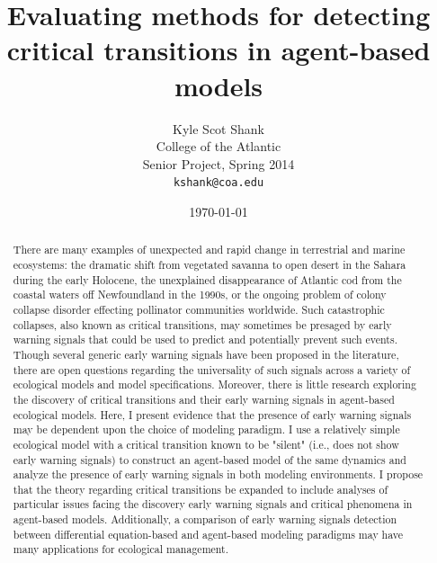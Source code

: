\documentclass[12pt]{article}
\begin{document}
\title{Evaluating methods for detecting critical transitions in agent-based models}
\author{Kyle Scot Shank\\
  College of the Atlantic\\
  Senior Project, Spring 2014\\
  \texttt{kshank@coa.edu}}
\date{\today}
\maketitle
\thispagestyle{empty}
\newpage

\begin{abstract}\noindent
There are many examples of unexpected and rapid change in terrestrial and marine ecosystems: the dramatic shift from vegetated savanna to open desert in the Sahara during the early Holocene, the unexplained disappearance of Atlantic cod from the coastal waters off Newfoundland in the 1990s, or the ongoing problem of colony collapse disorder effecting pollinator communities worldwide. Such catastrophic collapses, also known as critical transitions, may sometimes be presaged by early warning signals that could be used to predict and potentially prevent such events. Though several generic early warning signals have been proposed in the literature, there are open questions regarding the universality of such signals across a variety of ecological models and model specifications. Moreover, there is little research exploring the discovery of critical transitions and their early warning signals in agent-based ecological models. Here, I present evidence that the presence of early warning signals may be dependent upon the choice of modeling paradigm. I use a relatively simple ecological model with a critical transition known to be "silent" (i.e.,  does not show early warning signals) to construct an agent-based model of the same dynamics and analyze the presence of early warning signals in both modeling environments. I propose that the theory regarding critical transitions be expanded to include analyses of particular issues facing the discovery early warning signals and critical phenomena in agent-based models. Additionally, a comparison of early warning signals detection between differential equation-based and agent-based modeling paradigms may have many applications for ecological management.
\end{abstract}
\newpage
\tableofcontents
\newpage
\end{document}

